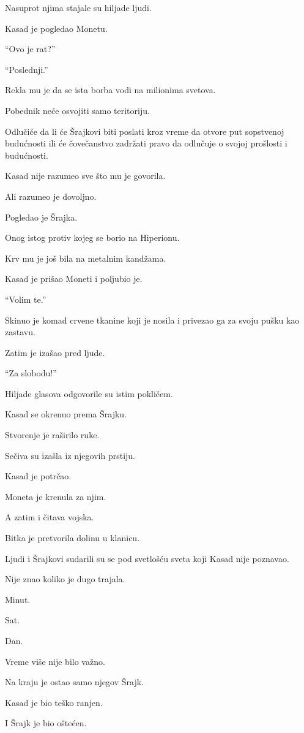 Nasuprot njima stajale su hiljade ljudi.

Kasad je pogledao Monetu.

``Ovo je rat?''

``Poslednji.''

Rekla mu je da se ista borba vodi na milionima svetova.

Pobednik neće osvojiti samo teritoriju.

Odlučiće da li će Šrajkovi biti poslati kroz vreme da otvore put sopstvenoj budućnosti ili će čovečanstvo zadržati pravo da odlučuje o svojoj prošlosti i budućnosti.

Kasad nije razumeo sve što mu je govorila.

Ali razumeo je dovoljno.

Pogledao je Šrajka.

Onog istog protiv kojeg se borio na Hiperionu.

Krv mu je još bila na metalnim kandžama.

Kasad je prišao Moneti i poljubio je.

``Volim te.''

Skinuo je komad crvene tkanine koji je nosila i privezao ga za svoju pušku kao zastavu.

Zatim je izašao pred ljude.

``Za slobodu!''

Hiljade glasova odgovorile su istim pokličem.

Kasad se okrenuo prema Šrajku.

Stvorenje je raširilo ruke.

Sečiva su izašla iz njegovih prstiju.

Kasad je potrčao.

Moneta je krenula za njim.

A zatim i čitava vojska.

\bigskip

Bitka je pretvorila dolinu u klanicu.

Ljudi i Šrajkovi sudarili su se pod svetlošću sveta koji Kasad nije poznavao.

Nije znao koliko je dugo trajala.

Minut.

Sat.

Dan.

Vreme više nije bilo važno.

Na kraju je ostao samo njegov Šrajk.

Kasad je bio teško ranjen.

I Šrajk je bio oštećen.

